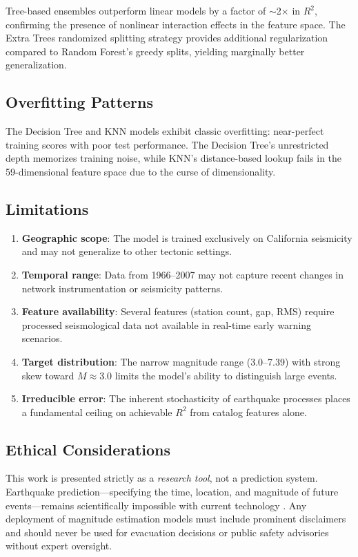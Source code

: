 \documentclass[journal,10pt,twocolumn]{IEEEtran}
\begin{document}
Tree-based ensembles outperform linear models by a factor of $\sim$2$\times$ in $R^2$, confirming the presence of nonlinear interaction effects in the feature space. The Extra Trees randomized splitting strategy provides additional regularization compared to Random Forest's greedy splits, yielding marginally better generalization.

\subsection{Overfitting Patterns}

The Decision Tree and KNN models exhibit classic overfitting: near-perfect training scores with poor test performance. The Decision Tree's unrestricted depth memorizes training noise, while KNN's distance-based lookup fails in the 59-dimensional feature space due to the curse of dimensionality.

\subsection{Limitations}

\begin{enumerate}
    \item \textbf{Geographic scope}: The model is trained exclusively on California seismicity and may not generalize to other tectonic settings.
    \item \textbf{Temporal range}: Data from 1966--2007 may not capture recent changes in network instrumentation or seismicity patterns.
    \item \textbf{Feature availability}: Several features (station count, gap, RMS) require processed seismological data not available in real-time early warning scenarios.
    \item \textbf{Target distribution}: The narrow magnitude range (3.0--7.39) with strong skew toward $M \approx 3.0$ limits the model's ability to distinguish large events.
    \item \textbf{Irreducible error}: The inherent stochasticity of earthquake processes places a fundamental ceiling on achievable $R^2$ from catalog features alone.
\end{enumerate}

\subsection{Ethical Considerations}

This work is presented strictly as a \emph{research tool}, not a prediction system. Earthquake prediction—specifying the time, location, and magnitude of future events—remains scientifically impossible with current technology \cite{geller1997}. Any deployment of magnitude estimation models must include prominent disclaimers and should never be used for evacuation decisions or public safety advisories without expert oversight.
\end{document}
